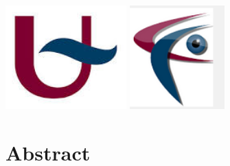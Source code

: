 \documentclass[12pt]{report}
\begin{document}
\begin{titlepage}




\includegraphics[height=4cm]{download.jpg}
\hspace{5 cm}
\includegraphics[height=4cm]{vlabsym.png}
 \\[1cm] %

 

\vfill %

\end{titlepage}
\tableofcontents


\newpage
\chapter*{Abstract}
\end{document}
